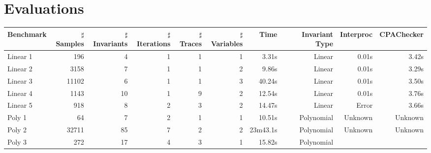 
\section{Evaluations} %
\label{sec:evaluations}


\begin{table*}[t]
    \begin{center}
    \begin{center}
    \begin{adjustbox}{max width=1\textwidth}
    \begin{tabular}{l | r | r | r | r | r | r | r | r | r}
        \hline\hline
        Benchmark 
            & $\sharp$Samples & $\sharp$Invariants & $\sharp$Iterations 
            & $\sharp$Traces & $\sharp$Variables
            & Time & Invariant Type 
            & Interproc & CPAChecker 
            \\
        \hline
        Linear 1
            & 196 & 4 & 1 
            & 1 & 1
            & 3.31s & Linear 
            & 0.01s & 3.42s
            \\
        \hline
        Linear 2
            & 3158 & 7 & 1 
            & 1 & 2
            & 9.86s & Linear 
            & 0.01s & 3.29s
            \\
        \hline
        Linear 3
            & 11102 & 6 & 1
            & 1 & 3
            & 40.24s & Linear 
            & 0.01s & 3.50s
            \\
        \hline
        Linear 4
            & 1143 & 10 & 1
            & 9 & 2
            & 12.54s & Linear 
            & 0.01s & 3.76s
            \\
        \hline
        Linear 5
            & 918 & 8 & 2 
            & 3 & 2
            & 14.47s & Linear 
            & Error & 3.66s
            \\
        \hline
        Poly 1
            & 64 & 7 & 2
            & 1 & 1 
            & 10.51s & Polynomial 
            & Unknown & Unknown 
            \\
        \hline
        Poly 2 
            & 32711 & 85 & 7 
            & 2 & 2
            & 23m43.1s & Polynomial
            & Unknown & Unknown 
            \\
        \hline
        Poly 3 
            & 272 & 17 & 4 
            & 3 & 1 
            & 15.82s & Polynomial 

\end{tabular}
\end{adjustbox}
\end{center}
\end{center}
\end{table*}
